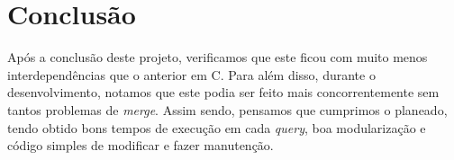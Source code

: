 \documentclass[a4paper]{article}
\begin{document}
	\section{Conclusão}
		\tab Após a conclusão deste projeto, verificamos que este ficou com muito menos
		interdependências que o anterior em C. Para além disso, durante o desenvolvimento,
		notamos que este podia ser feito mais concorrentemente sem tantos problemas de
		\textit{merge}. Assim sendo, pensamos que cumprimos o planeado, tendo obtido
		bons tempos de execução em cada \textit{query}, boa modularização e código
		simples de modificar e fazer manutenção.
\end{document}
